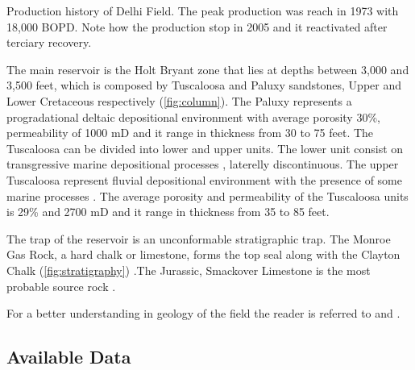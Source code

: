                   {Production history of Delhi Field. The peak production was reach in
                   1973 with 18,000 BOPD. Note how the production stop in 2005 and it 
                   reactivated after terciary recovery.}


The main reservoir is the Holt Bryant zone that lies at depths between 3,000 and 3,500
feet,  which is composed by Tuscaloosa and Paluxy sandstones, Upper and Lower Cretaceous 
respectively (\ref{fig:column}). The Paluxy represents a progradational deltaic depositional environment
 \citep{ref:nick} with average porosity 30\%, permeability of 1000 mD and it range in thickness
from 30 to 75 feet. The Tuscaloosa can be divided into lower and upper units. The lower unit 
consist on transgressive marine depositional processes \citep{ref:doug}, laterelly discontinuous.
The upper Tuscaloosa represent fluvial depositional environment with the presence of some marine
processes \citep{ref:doug}. The average porosity and permeability of the Tuscaloosa units is 29\%
 and 2700 mD and it range in thickness from 35 to 85 feet. 

The trap of the reservoir is an unconformable stratigraphic trap. The Monroe Gas Rock, 
a hard chalk or  limestone, forms the top seal \citep{ref:powell} along with the Clayton Chalk (\ref{fig:stratigraphy}) 
\citep{ref:nick}.The Jurassic, Smackover Limestone is the most probable source rock \citep{ref:mancini}.

For a better understanding in geology of the field the reader is referred 
to \citep{ref:nick} and \citep{ref:doug}.



\newpage

\subsection{Available Data}


